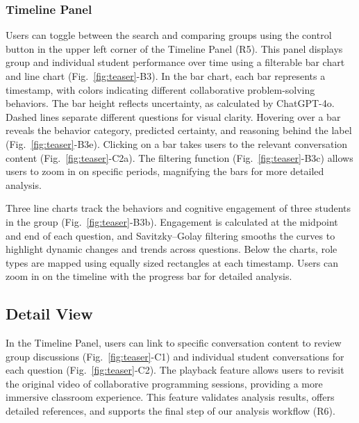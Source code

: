\subsubsection{Timeline Panel}
\label{barchart}
Users can toggle between the search and comparing groups using the control button in the upper left corner of the Timeline Panel (R5). This panel displays group and individual student performance over time using a filterable bar chart and line chart (Fig.~\ref{fig:teaser}-B3).
In the bar chart, each bar represents a timestamp, with colors indicating different collaborative problem-solving behaviors. The bar height reflects uncertainty, as calculated by ChatGPT-4o. Dashed lines separate different questions for visual clarity. Hovering over a bar reveals the behavior category, predicted certainty, and reasoning behind the label (Fig.~\ref{fig:teaser}-B3e). Clicking on a bar takes users to the relevant conversation content (Fig.~\ref{fig:teaser}-C2a).
The filtering function (Fig.~\ref{fig:teaser}-B3c) allows users to zoom in on specific periods, magnifying the bars for more detailed analysis. 

Three line charts track the behaviors and cognitive engagement of three students in the group (Fig.~\ref{fig:teaser}-B3b). Engagement is calculated at the midpoint and end of each question, and Savitzky–Golay filtering smooths the curves to highlight dynamic changes and trends across questions.
Below the charts, role types are mapped using equally sized rectangles at each timestamp. Users can zoom in on the timeline with the progress bar for detailed analysis. 






\subsection{Detail View}
In the Timeline Panel, users can link to specific conversation content to review group discussions (Fig.~\ref{fig:teaser}-C1) and individual student conversations for each question (Fig.~\ref{fig:teaser}-C2). The playback feature allows users to revisit the original video of collaborative programming sessions, providing a more immersive classroom experience. This feature validates analysis results, offers detailed references, and supports the final step of our analysis workflow (R6).

